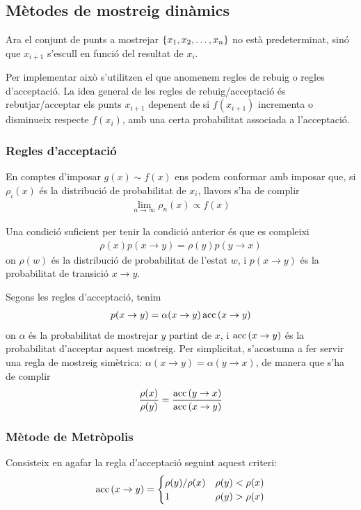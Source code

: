 \subsection{Mètodes de mostreig dinàmics}
Ara el conjunt de punts a mostrejar $\qty{x_{1}, x_{2}, \dots, x_{n}}$ no està predeterminat, sinó que $x_{i+1}$ s'escull en funció del resultat de $x_{i}$.

Per implementar això s'utilitzen el que anomenem regles de rebuig o regles d'acceptació. La idea general de les regles de rebuig/acceptació és rebutjar/acceptar els punts $x_{i+1}$ depenent de si $f(x_{i+1})$ incrementa o disminueix respecte $f(x_{i})$, amb una certa probabilitat associada a l'acceptació.

\subsubsection*{Regles d'acceptació}
En comptes d'imposar $g(x) \sim f(x)$ ens podem conformar amb imposar que, si $\rho_{i}(x)$ és la distribució de probabilitat de $x_{i}$, llavors s'ha de complir
\begin{align*}
	\lim_{n \to \infty} \rho_{n}(x) \propto f(x)
\end{align*}

\begin{thm}
	Una condició suficient per tenir la condició anterior és que es compleixi
	\begin{align*}
		\rho(x)p(x \to y) = \rho(y)p(y \to x)
	\end{align*}
	on $\rho(w)$ és la distribució de probabilitat de l'estat $w$, i $p(x \to y)$ és la probabilitat de transició $x \to y$.
\end{thm}

Segons les regles d'acceptació, tenim
\begin{align*}
	p(x \to y) = \alpha(x \to y) \operatorname{acc}\qty(x \to y)
\end{align*}
on $\alpha$ és la probabilitat de mostrejar $y$ partint de $x$, i $\operatorname{acc}\qty(x \to y)$ és la probabilitat d'acceptar aquest mostreig. Per simplicitat, s'acostuma a fer servir una regla de mostreig simètrica: $\alpha(x \to y) = \alpha(y \to x)$, de manera que s'ha de complir
\begin{align}
	\frac{\rho(x)}{\rho(y)} = \frac{\operatorname{acc}\qty(y \to x)}{\operatorname{acc}\qty(x \to y)}
\end{align}

\subsubsection*{Mètode de Metròpolis}
\begin{meth}\label{meth:metropolis}
	Consisteix en agafar la regla d'acceptació seguint aquest criteri:
	\begin{align}
		\operatorname{acc}\qty(x \to y) =
		\begin{cases}
			\rho(y)/\rho(x) & \rho(y) < \rho(x) \\
			1               & \rho(y) > \rho(x)
		\end{cases}
	\end{align}
\end{meth}

